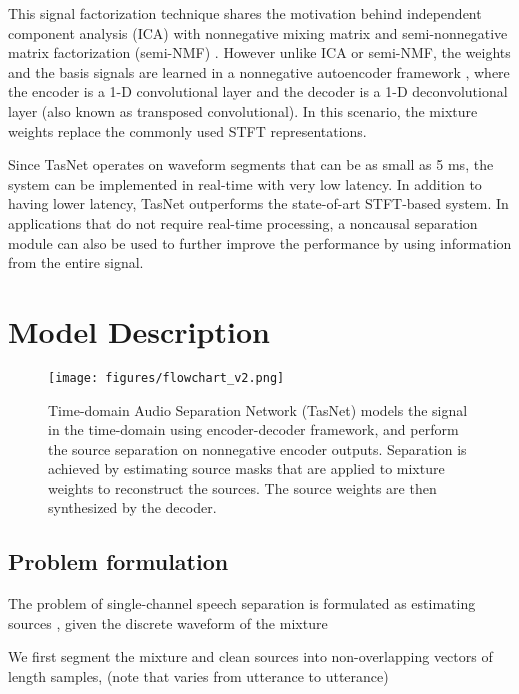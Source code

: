 \documentclass{article}
\begin{document}
This signal factorization technique shares the motivation behind independent component analysis (ICA) with nonnegative mixing matrix \cite{wang2010nonnegative} and semi-nonnegative matrix factorization (semi-NMF) \cite{ding2010convex}. However unlike ICA or semi-NMF, the weights and the basis signals are learned in a nonnegative autoencoder framework \cite{hosseini2016deep, lemme2012online, chorowski2015learning, smaragdis2017neural}, where the encoder is a 1-D convolutional layer and the decoder is a 1-D deconvolutional layer (also known as transposed convolutional). In 
this scenario, the mixture weights replace the commonly used STFT representations. 

Since TasNet operates on waveform segments that can be as small as 5 ms, the system can be implemented in real-time with very low latency. In addition to having lower latency, TasNet outperforms the state-of-art STFT-based system. In applications that do not require real-time processing, a noncausal separation module can also be used to further improve the performance by using information from the entire signal. 

\section{Model Description}
\label{sec:model}

\begin{figure*}[!ht]
\centering
\texttt{[image: figures/flowchart\_v2.png]}
\caption{Time-domain Audio Separation Network (TasNet) models the signal in the time-domain using encoder-decoder framework, and perform the source separation on nonnegative encoder outputs. Separation is achieved by estimating source masks that are applied to mixture weights to reconstruct the sources. The source weights are then synthesized by the decoder.}
\label{fig:flow}
\end{figure*}

\subsection{Problem formulation}

The problem of single-channel speech separation is formulated as estimating  sources , given the discrete waveform of the mixture 

We first segment the mixture and clean sources into  non-overlapping vectors of length  samples,  (note that  varies from utterance to utterance)
\end{document}
